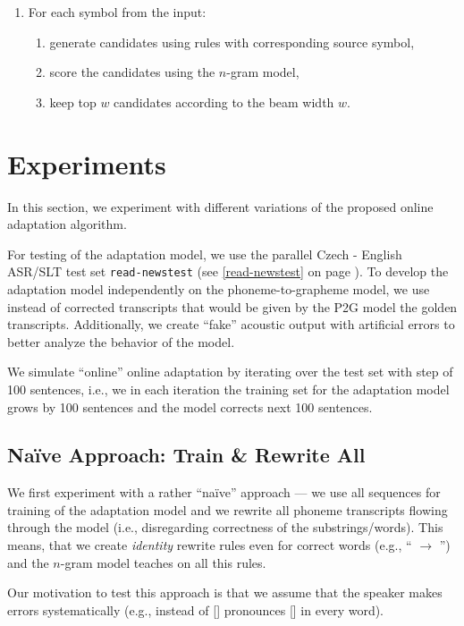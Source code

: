 \begin{enumerate}
	\item For each symbol from the input:
		\begin{enumerate}
			\item generate candidates using rules with corresponding source symbol,
			\item score the candidates using the $n$-gram model,
			\item keep top $w$ candidates according to the beam width $w$. 
		\end{enumerate}
\end{enumerate}



\section{Experiments}
\label{oeasr:experiments}
In this section, we experiment with different variations of the proposed online adaptation algorithm.

For testing of the adaptation model, we use the parallel Czech - English ASR/SLT test set \texttt{read-newstest} (see \cref{read-newstest} on page \pageref{read-newstest}). To develop the adaptation model independently on the phoneme-to-grapheme model, we use instead of corrected transcripts that would be given by the P2G model the golden transcripts. Additionally, we create ``fake'' acoustic output with artificial errors to better analyze the behavior of the model.

We simulate ``online'' online adaptation by iterating over the test set with step of 100 sentences, i.e., we in each iteration the training set for the adaptation model grows by 100 sentences and the model corrects next 100 sentences.

\subsection{Na\"ive Approach: Train \& Rewrite All}
We first experiment with a rather ``na\"ive'' approach --- we use all sequences for training of the adaptation model and we rewrite all phoneme transcripts flowing through the model (i.e., disregarding correctness of the substrings/words). This means, that we create \emph{identity} rewrite rules even for correct words (e.g., `` $\rightarrow$ '') and the $n$-gram model teaches on all this rules. 

Our motivation to test this approach is that we assume that the speaker makes errors systematically (e.g., instead of [] pronounces [] in every word).

